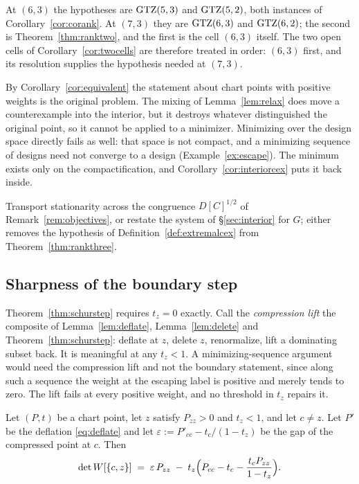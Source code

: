 At $(6,3)$ the hypotheses are $\mathrm{GTZ}(5,3)$ and $\mathrm{GTZ}(5,2)$, both
instances of Corollary~\ref{cor:corank}.  At $(7,3)$ they are
$\mathrm{GTZ}(6,3)$ and $\mathrm{GTZ}(6,2)$; the second is Theorem~\ref{thm:ranktwo},
and the first is the cell $(6,3)$ itself.
The two open cells of Corollary~\ref{cor:twocells} are therefore treated
in order: $(6,3)$ first, and its resolution supplies the hypothesis
needed at $(7,3)$.

By Corollary~\ref{cor:equivalent} the statement about chart points with
positive weights is the original problem.  The mixing of
Lemma~\ref{lem:relax} does move a counterexample into the interior, but
it destroys whatever distinguished the original point, so it cannot be
applied to a minimizer.  Minimizing over the design space directly fails
as well: that space is not compact, and a minimizing sequence of designs
need not converge to a design (Example~\ref{ex:escape}).  The minimum
exists only on the compactification, and
Corollary~\ref{cor:interiorcex} puts it back inside.

\begin{wip}
Transport stationarity across the congruence $D[C]^{1/2}$ of
Remark~\ref{rem:objectives}, or restate the system of
\S\ref{sec:interior} for $G$; either removes the hypothesis of
Definition~\ref{def:extremalcex} from Theorem~\ref{thm:rankthree}.
\end{wip}

\subsection{Sharpness of the boundary step}\label{sec:sharp}

Theorem~\ref{thm:schurstep} requires $t_z=0$ exactly.  Call the
\emph{compression lift} the composite of Lemma~\ref{lem:deflate},
Lemma~\ref{lem:delete} and Theorem~\ref{thm:schurstep}: deflate at $z$,
delete $z$, renormalize, lift a dominating subset back.  It is meaningful
at any $t_z<1$.  A minimizing-sequence argument would need the
compression lift and not the boundary statement, since along such a
sequence the weight at the escaping label is positive and merely tends to
zero.  The lift fails at every positive weight, and no threshold in $t_z$
repairs it.

\begin{lemma}\label{lem:pairdet}
Let $(P,t)$ be a chart point, let $z$ satisfy $P_{zz}>0$ and $t_z<1$, and
let $c\ne z$.  Let $P'$ be the deflation \eqref{eq:deflate} and let
$\varepsilon:=P'_{cc}-t_c/(1-t_z)$ be the gap of the compressed point at $c$.
Then
\begin{equation}\label{eq:family}
  \det W[\{c,z\}]
  \;=\;\varepsilon\,P_{zz}\;-\;t_z\Bigl(P_{cc}-t_c-\frac{t_cP_{zz}}{1-t_z}\Bigr) .
\end{equation}
\end{lemma}

